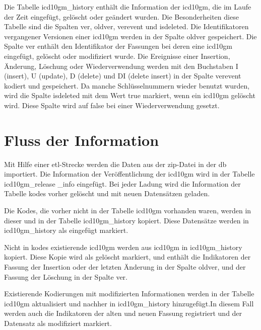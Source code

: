 Die Tabelle \glqq\textsf{icd10gm\_history}\grqq{} enthält die Information der \ac{icd10gm}, die im Laufe der Zeit eingefügt, gelöscht oder geändert wurden. Die Besonderheiten diese Tabelle sind die Spalten \glqq\textsf{ver}\grqq{}, \glqq\textsf{oldver}\grqq{}, \glqq\textsf{verevent}\grqq{} und \glqq\textsf{isdeleted}\grqq{}. Die Identifikatoren vergangener Versionen einer \ac{icd10gm} werden in der Spalte \glqq\textsf{oldver}\grqq{} gespeichert. Die Spalte \glqq\textsf{ver}\grqq{} enthält den Identifikator der Fassungen bei deren eine \ac{icd10gm} eingefügt, gelöscht oder modifiziert wurde. Die Ereignisse einer Insertion, Änderung, Löschung oder Wiederverwendung werden mit den Buchstaben \glqq\textsf{I}\grqq{} (insert), \glqq\textsf{U}\grqq{} (update), \glqq\textsf{D}\grqq{} (delete) und \glqq\textsf{DI}\grqq{} (delete insert) in der Spalte \glqq\textsf{verevent}\grqq{} kodiert und gespeichert. Da manche Schlüsselnummern wieder benutzt wurden, wird die Spalte \glqq\textsf{isdeleted}\grqq{} mit dem Wert \glqq true\grqq{} markiert, wenn ein \ac{icd10gm} gelöscht wird. Diese Spalte wird auf \glqq false\grqq{} bei einer Wiederverwendung gesetzt.

\section{Fluss der Information} \label{sec:dbrun}

Mit Hilfe einer \ac{etl}-Strecke werden die Daten aus der \ac{zip}-Datei in der \ac{db} importiert. Die Information der Veröffentlichung der \ac{icd10gm} wird in der Tabelle \glqq\textsf{icd10gm\_release \_info}\grqq{} eingefügt. Bei jeder Ladung wird die Information der Tabelle \glqq\textsf{kodes}\grqq{} vorher gelöscht und mit neuen Datensätzen geladen. 

Die Kodes, die vorher nicht in der Tabelle \glqq\textsf{icd10gm}\grqq{} vorhanden waren, werden in dieser und in der Tabelle \glqq\textsf{icd10gm\_history}\grqq{} kopiert. Diese Datensätze werden in \glqq\textsf{icd10gm\_history}\grqq{} als eingefügt markiert. 

Nicht in \glqq\textsf{kodes}\grqq{} existierende \ac{icd10gm} werden aus \glqq\textsf{icd10gm}\grqq{} in \glqq\textsf{icd10gm\_history}\grqq{} kopiert. Diese Kopie wird als gelöscht markiert, und enthält die Indikatoren der Fassung der Insertion oder der letzten Änderung in der Spalte \textsf{oldver}\grqq{}, und der Fassung der Löschung in der Spalte \glqq\textsf{ver}\grqq{}. 

Existierende Kodierungen mit modifizierten Informationen werden in der Tabelle \glqq\textsf{icd10gm}\grqq{} aktualisiert und nachher in \glqq\textsf{icd10gm\_history}\grqq{} hinzugefügt.In diesem Fall werden auch die Indikatoren der alten und neuen Fassung registriert und der Datensatz als modifiziert markiert.

